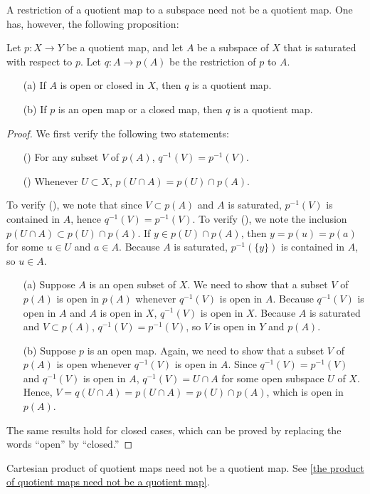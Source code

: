 A restriction of a quotient map to a subspace need not be a quotient map.
One has, however, the following proposition:
\begin{prop}
    Let $p: X\rightarrow Y$ be a quotient map, and let $A$ be a subspace of $X$ that is saturated with respect to $p$.
    Let $q: A\rightarrow p(A)$ be the restriction of $p$ to $A$.
    \begin{enumerate}
        \item[(a)]
        {
            If $A$ is open or closed in $X$, then $q$ is a quotient map.
        }
        \item[(b)]
        {
            If $p$ is an open map or a closed map, then $q$ is a quotient map.
        }
    \end{enumerate}
\end{prop}
\begin{proof}
    We first verify the following two statements:
    \begin{enumerate}
        \item[(\romannumeral 1)]
        {
            For any subset $V$ of $p(A)$, $q^{-1}(V)=p^{-1}(V)$.
        }
        \item[(\romannumeral 2)]
        {
            Whenever $U\subset X$, $p(U\cap A)=p(U)\cap p(A)$.
        }
    \end{enumerate}
    To verify (), we note that since $V\subset p(A)$ and $A$ is saturated, $p^{-1}(V)$ is contained in $A$, hence $q^{-1}(V)=p^{-1}(V)$.
    To verify (), we note the inclusion $p(U\cap A)\subset p(U)\cap p(A)$.
    If $y\in p(U)\cap p(A)$, then $y=p(u)=p(a)$ for some $u\in U$ and $a\in A$.
    Because $A$ is saturated, $p^{-1}(\{y\})$ is contained in $A$, so $u\in A$.
    \begin{enumerate}
        \item[(a)]
        {
            Suppose $A$ is an open subset of $X$.
            We need to show that a subset $V$ of $p(A)$ is open in $p(A)$ whenever $q^{-1}(V)$ is open in $A$.
            Because $q^{-1}(V)$ is open in $A$ and $A$ is open in $X$, $q^{-1}(V)$ is open in $X$.
            Because $A$ is saturated and $V\subset p(A)$, $q^{-1}(V)=p^{-1}(V)$, so $V$ is open in $Y$ and $p(A)$.
        }
        \item[(b)]
        {
            Suppose $p$ is an open map.
            Again, we need to show that a subset $V$ of $p(A)$ is open whenever $q^{-1}(V)$ is open in $A$.
            Since $q^{-1}(V)=p^{-1}(V)$ and $q^{-1}(V)$ is open in $A$, $q^{-1}(V)=U\cap A$ for some open subspace $U$ of $X$.
            Hence, $V=q(U\cap A)=p(U\cap A)=p(U)\cap p(A)$, which is open in $p(A)$.
        }
    \end{enumerate}
    The same results hold for closed cases, which can be proved by replacing the words ``open'' by ``closed.''
\end{proof}
\begin{rmk}
    Cartesian product of quotient maps need not be a quotient map.
    See \cref{the product of quotient maps need not be a quotient map}.
\end{rmk}

